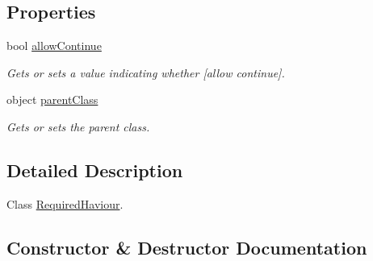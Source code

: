 \subsection*{Properties}
\begin{DoxyCompactItemize}
\item 
bool \hyperlink{class_lerp2_a_p_i_1_1_hepers_1_1_unity___extensions_1_1_utils_1_1_required_haviour_a2180daf27bd60735cafaabfbbe458a54}{allow\+Continue}
\begin{DoxyCompactList}\small\item\em Gets or sets a value indicating whether \mbox{[}allow continue\mbox{]}. \end{DoxyCompactList}\item 
object \hyperlink{class_lerp2_a_p_i_1_1_hepers_1_1_unity___extensions_1_1_utils_1_1_required_haviour_a5bb84d35fba62a59e08fbd925012ba54}{parent\+Class}
\begin{DoxyCompactList}\small\item\em Gets or sets the parent class. \end{DoxyCompactList}\end{DoxyCompactItemize}


\subsection{Detailed Description}
Class \hyperlink{class_lerp2_a_p_i_1_1_hepers_1_1_unity___extensions_1_1_utils_1_1_required_haviour}{Required\+Haviour}. 



\subsection{Constructor \& Destructor Documentation}
\mbox{\label{class_lerp2_a_p_i_1_1_hepers_1_1_unity___extensions_1_1_utils_1_1_required_haviour_a63e0e72371c9dc3e746d6e7f0c40e843}} 
